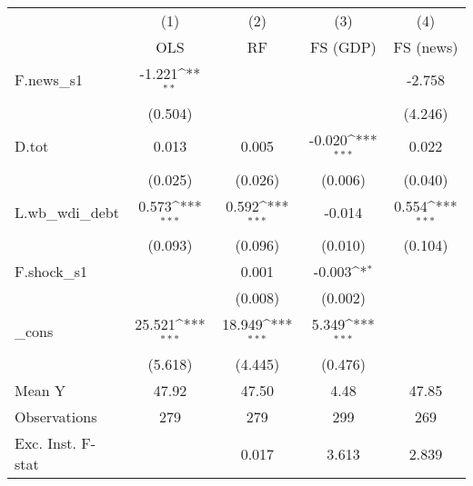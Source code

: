 {
\def\sym#1{\ifmmode^{#1}\else\(^{#1}\)\fi}
\begin{tabular}{l*{4}{c}}
\toprule
            &\multicolumn{1}{c}{(1)}&\multicolumn{1}{c}{(2)}&\multicolumn{1}{c}{(3)}&\multicolumn{1}{c}{(4)}\\
            &\multicolumn{1}{c}{OLS}&\multicolumn{1}{c}{RF}&\multicolumn{1}{c}{FS (GDP)}&\multicolumn{1}{c}{FS (news)}\\
\midrule
F.news\_s1   &      -1.221\sym{**} &                     &                     &      -2.758         \\
            &     (0.504)         &                     &                     &     (4.246)         \\
\addlinespace
D.tot       &       0.013         &       0.005         &      -0.020\sym{***}&       0.022         \\
            &     (0.025)         &     (0.026)         &     (0.006)         &     (0.040)         \\
\addlinespace
L.wb\_wdi\_debt&       0.573\sym{***}&       0.592\sym{***}&      -0.014         &       0.554\sym{***}\\
            &     (0.093)         &     (0.096)         &     (0.010)         &     (0.104)         \\
\addlinespace
F.shock\_s1  &                     &       0.001         &      -0.003\sym{*}  &                     \\
            &                     &     (0.008)         &     (0.002)         &                     \\
\addlinespace
\_cons      &      25.521\sym{***}&      18.949\sym{***}&       5.349\sym{***}&                     \\
            &     (5.618)         &     (4.445)         &     (0.476)         &                     \\
\midrule
Mean Y      &       47.92         &       47.50         &        4.48         &       47.85         \\
Observations&         279         &         279         &         299         &         269         \\
Exc. Inst. F-stat&                     &       0.017         &       3.613         &       2.839         \\
\bottomrule
\end{tabular}
}
